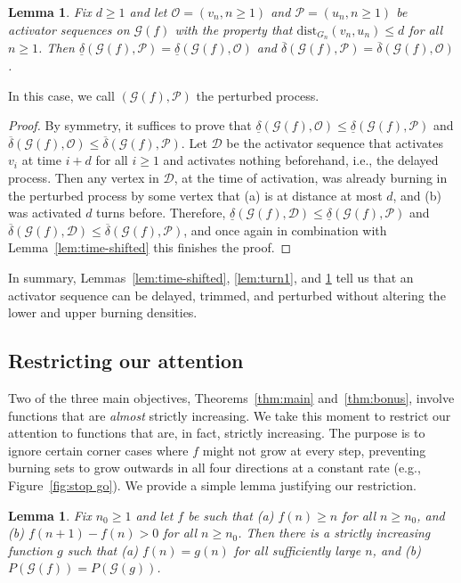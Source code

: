 \documentclass[12pt]{article}
\newtheorem{lemma}[theorem]{Lemma}
\theoremstyle{remark}
\newcommand\cD{\mathcal D}
\newcommand\cG{\mathcal G}
\newcommand\cO{\mathcal O}
\newcommand\cP{\mathcal P}
\begin{document}
\begin{lemma}\label{lem:position-shifted}
Fix $d \geq 1$ and let $\cO = (v_n,n \geq 1)$ and $\cP = (u_n,n \geq 1)$ be activator sequences on $\cG(f)$ with the property that $\mathrm{dist}_{G_n}(v_n,u_n) \leq d$ for all $n \geq 1$. Then $\underline{\delta}(\cG(f),\cP) = \underline{\delta}(\cG(f),\cO)$ and $\overline{\delta}(\cG(f),\cP) = \overline{\delta}(\cG(f),\cO)$.
\end{lemma}

In this case, we call $(\cG(f), \cP)$ the perturbed process. 

\begin{proof}
By symmetry, it suffices to prove that $\underline{\delta}(\cG(f),\cO) \leq \underline{\delta}(\cG(f),\cP)$ and $\overline{\delta}(\cG(f),\cO) \leq \overline{\delta}(\cG(f),\cP)$. Let $\cD$ be the activator sequence that activates $v_i$ at time $i+d$ for all $i \geq 1$ and activates nothing beforehand, i.e., the delayed process. Then any vertex in $\cD$, at the time of activation, was already burning in the perturbed process by some vertex that (a) is at distance at most $d$, and (b) was activated $d$ turns before. Therefore, $\underline{\delta}(\cG(f),\cD) \leq \underline{\delta}(\cG(f),\cP)$ and $\overline{\delta}(\cG(f),\cD) \leq \overline{\delta}(\cG(f),\cP)$, and once again in combination with Lemma~\ref{lem:time-shifted} this finishes the proof. 
\end{proof}

In summary, Lemmas~\ref{lem:time-shifted}, \ref{lem:turn1}, and \ref{lem:position-shifted} tell us that an activator sequence can be delayed, trimmed, and perturbed without altering the lower and upper burning densities. 

\subsection{Restricting our attention}\label{sec:aux2}

Two of the three main objectives, Theorems~\ref{thm:main} and~\ref{thm:bonus}, involve functions that are \emph{almost} strictly increasing. We take this moment to restrict our attention to functions that are, in fact, strictly increasing. The purpose is to ignore certain corner cases where $f$ might not grow at every step, preventing burning sets to grow outwards in all four directions at a constant rate (e.g., Figure~\ref{fig:stop go}). We provide a simple lemma justifying our restriction.

\begin{lemma}\label{lem:almost -> strictly}
Fix $n_0 \geq 1$ and let $f$ be such that (a) $f(n) \geq n$ for all $n \geq n_0$, and (b) $f(n+1)-f(n) > 0$ for all $n \geq n_0$. Then there is a strictly increasing function $g$ such that (a) $f(n) = g(n)$ for all sufficiently large $n$, and (b) $P(\cG(f)) = P(\cG(g))$.
\end{lemma}
\end{document}

